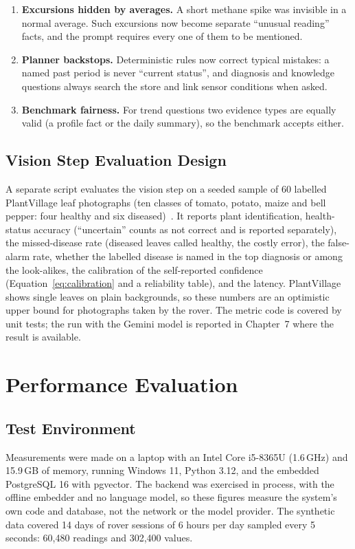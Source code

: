 \begin{enumerate}
\item \textbf{Excursions hidden by averages.} A short methane spike was invisible in a normal average. Such excursions now become separate
      ``unusual reading'' facts, and the prompt requires every one of them to be mentioned.
\item \textbf{Planner backstops.} Deterministic rules now correct typical mistakes: a named past period is never ``current status'',
      and diagnosis and knowledge questions always search the store and link sensor conditions when asked.
\item \textbf{Benchmark fairness.} For trend questions two evidence types are equally valid (a profile fact or the daily summary), so the
      benchmark accepts either.
\end{enumerate}

\subsection{Vision Step Evaluation Design}

A separate script evaluates the vision step on a seeded sample of 60 labelled PlantVillage leaf photographs (ten classes of tomato,
potato, maize and bell pepper: four healthy and six diseased)~\cite{mohanty2016plantvillage}. It reports plant identification,
health-status accuracy (``uncertain'' counts as not correct and is reported separately), the missed-disease rate (diseased leaves called
healthy, the costly error), the false-alarm rate, whether the labelled disease is named in the top diagnosis or among the look-alikes,
the calibration of the self-reported confidence (Equation~\ref{eq:calibration} and a reliability table), and the latency. PlantVillage
shows single leaves on plain backgrounds, so these numbers are an optimistic upper bound for photographs taken by the rover. The metric code is covered by
unit tests; the run with the Gemini model is reported in Chapter~7 where the result is
available.

\section{Performance Evaluation}

\subsection{Test Environment}

Measurements were made on a laptop with an Intel Core i5-8365U (1.6\,GHz) and 15.9\,GB of memory, running Windows 11, Python 3.12, and the
embedded PostgreSQL 16 with pgvector. The backend was exercised in process, with the offline embedder and no language model, so these
figures measure the system's own code and database, not the network or the model provider. The synthetic data covered 14 days of rover sessions of
6 hours per day sampled every 5 seconds: 60,480 readings and 302,400 values.

